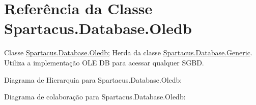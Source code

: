 \hypertarget{classSpartacus_1_1Database_1_1Oledb}{\section{Referência da Classe Spartacus.\+Database.\+Oledb}
\label{classSpartacus_1_1Database_1_1Oledb}
}


Classe \hyperlink{classSpartacus_1_1Database_1_1Oledb}{Spartacus.\+Database.\+Oledb}; Herda da classe \hyperlink{classSpartacus_1_1Database_1_1Generic}{Spartacus.\+Database.\+Generic}. Utiliza a implementação O\+L\+E D\+B para acessar qualquer S\+G\+B\+D.  




Diagrama de Hierarquia para Spartacus.\+Database.\+Oledb\+:


Diagrama de colaboração para Spartacus.\+Database.\+Oledb\+:
